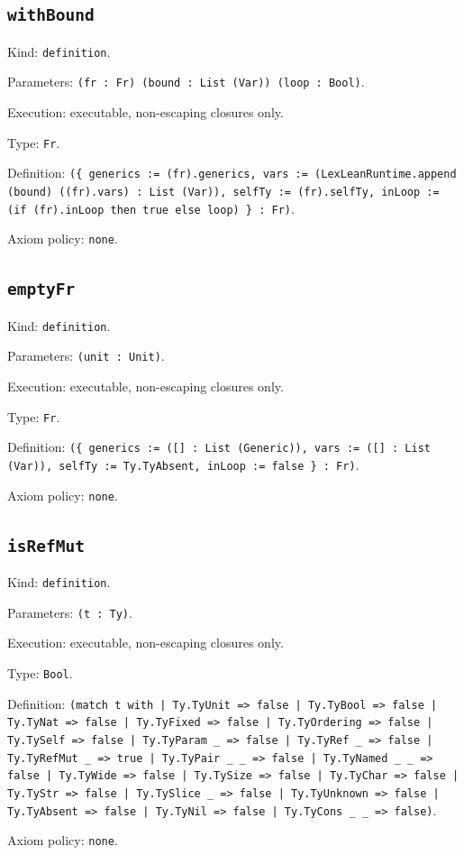 \documentclass[11pt]{article}
\begin{document}
\subsection*{\texttt{withBound}}
\noindent Kind: \texttt{definition}.\par
\noindent Parameters: \texttt{(fr : Fr) (bound : List (Var)) (loop : Bool)}.\par
\noindent Execution: executable, non-escaping closures only.\par
\noindent Type: \texttt{Fr}.\par
\noindent Definition: \texttt{(\{ generics := (fr).generics, vars := (LexLeanRuntime.append (bound) ((fr).vars) : List (Var)), selfTy := (fr).selfTy, inLoop := (if (fr).inLoop then true else loop) \} : Fr)}.\par
\noindent Axiom policy: \texttt{none}.\par
\subsection*{\texttt{emptyFr}}
\noindent Kind: \texttt{definition}.\par
\noindent Parameters: \texttt{(unit : Unit)}.\par
\noindent Execution: executable, non-escaping closures only.\par
\noindent Type: \texttt{Fr}.\par
\noindent Definition: \texttt{(\{ generics := ([] : List (Generic)), vars := ([] : List (Var)), selfTy := Ty.TyAbsent, inLoop := false \} : Fr)}.\par
\noindent Axiom policy: \texttt{none}.\par
\subsection*{\texttt{isRefMut}}
\noindent Kind: \texttt{definition}.\par
\noindent Parameters: \texttt{(t : Ty)}.\par
\noindent Execution: executable, non-escaping closures only.\par
\noindent Type: \texttt{Bool}.\par
\noindent Definition: \texttt{(match t with | Ty.TyUnit => false | Ty.TyBool => false | Ty.TyNat => false | Ty.TyFixed => false | Ty.TyOrdering => false | Ty.TySelf => false | Ty.TyParam \_ => false | Ty.TyRef \_ => false | Ty.TyRefMut \_ => true | Ty.TyPair \_ \_ => false | Ty.TyNamed \_ \_ => false | Ty.TyWide => false | Ty.TySize => false | Ty.TyChar => false | Ty.TyStr => false | Ty.TySlice \_ => false | Ty.TyUnknown => false | Ty.TyAbsent => false | Ty.TyNil => false | Ty.TyCons \_ \_ => false)}.\par
\noindent Axiom policy: \texttt{none}.\par
\end{document}
